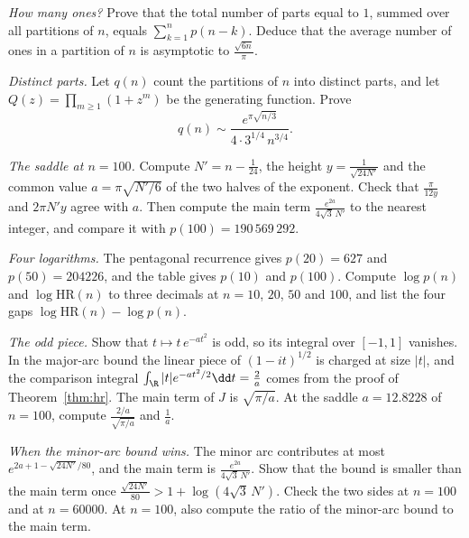 \begin{exercise}[$\star\star$]\label{ex:ones}
\emph{How many ones?} Prove that the total number of parts equal to $1$, summed over all partitions of $n$, equals $\sum_{k=1}^np(n-k)$. Deduce that the average number of ones in a partition of $n$ is asymptotic to $\frac{\sqrt{6n}}\pi$.
\end{exercise}

\begin{exercise}[$\star\star\star$]\label{ex:distinct}
\emph{Distinct parts.} Let $q(n)$ count the partitions of $n$ into distinct parts, and let $Q(z)=\prod_{m\ge1}(1+z^m)$ be the generating function. Prove
\[
q(n)\sim\frac{e^{\pi\sqrt{n/3}}}{4\cdot3^{1/4}\,n^{3/4}}.
\]
\end{exercise}

\begin{exercise}[$\star$]\label{ex:rw12a}
\emph{The saddle at $n=100$.} Compute $N'=n-\frac1{24}$, the height $y=\frac1{\sqrt{24N'}}$ and the common value $a=\pi\sqrt{N'/6}$ of the two halves of the exponent. Check that $\frac\pi{12y}$ and $2\pi N'y$ agree with $a$. Then compute the main term $\frac{e^{2a}}{4\sqrt3\,N'}$ to the nearest integer, and compare it with $p(100)=190\,569\,292$.
\end{exercise}

\begin{exercise}[$\star\star$]\label{ex:rw12b}
\emph{Four logarithms.} The pentagonal recurrence gives $p(20)=627$ and $p(50)=204226$, and the table gives $p(10)$ and $p(100)$. Compute $\log p(n)$ and $\log\mathrm{HR}(n)$ to three decimals at $n=10$, $20$, $50$ and $100$, and list the four gaps $\log\mathrm{HR}(n)-\log p(n)$.
\end{exercise}

\begin{exercise}[$\star\star$]\label{ex:rw12c}
\emph{The odd piece.} Show that $t\mapsto t\,e^{-at^2}$ is odd, so its integral over $[-1,1]$ vanishes. In the major-arc bound the linear piece of $(1-it)^{1/2}$ is charged at size $|t|$, and the comparison integral $\int_{\R}|t|e^{-at^2/2}\dd t=\frac2a$ comes from the proof of Theorem~\ref{thm:hr}. The main term of $J$ is $\sqrt{\pi/a}$. At the saddle $a=12.8228$ of $n=100$, compute $\frac{2/a}{\sqrt{\pi/a}}$ and $\frac1a$.
\end{exercise}

\begin{exercise}[$\star\star\star$]\label{ex:rw12d}
\emph{When the minor-arc bound wins.} The minor arc contributes at most $e^{2a+1-\sqrt{24N'}/80}$, and the main term is $\frac{e^{2a}}{4\sqrt3\,N'}$. Show that the bound is smaller than the main term once $\frac{\sqrt{24N'}}{80}>1+\log(4\sqrt3\,N')$. Check the two sides at $n=100$ and at $n=60000$. At $n=100$, also compute the ratio of the minor-arc bound to the main term.
\end{exercise}


